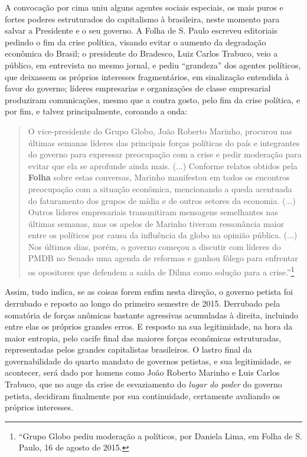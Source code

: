 A convocação por cima uniu alguns agentes sociais especiais, os mais
puros e fortes poderes estruturados do capitalismo à brasileira, neste
momento para salvar a Presidente e o seu governo. A Folha de S. Paulo
escreveu editoriais pedindo o fim da crise política, visando evitar o
aumento da degradação econômica do Brasil; o presidente do Bradesco,
Luiz Carlos Trabuco, veio a público, em entrevista no mesmo jornal, e
pediu ``grandeza'' dos agentes políticos, que deixassem os próprios
interesses fragmentários, em sinalização entendida à favor do governo;
líderes empresarias e organizações de classe empresarial produziram
comunicações, mesmo que a contra gosto, pelo fim da crise política, e
por fim, e talvez principalmente, coroando a onda:

\begin{quote}
O vice-presidente do Grupo Globo, João Roberto Marinho, procurou nas
últimas semanas líderes das principais forças políticas do país e
integrantes do governo para expressar preocupação com a crise e pedir
moderação para evitar que ela se aprofunde ainda mais. (...) Conforme
relatos obtidos pela \textbf{Folha} sobre estas conversas, Marinho
manifestou em todos os encontros preocupação com a situação econômica,
mencionando a queda acentuada do faturamento dos grupos de mídia e de
outros setores da economia. (...) Outros líderes empresariais
transmitiram mensagens semelhantes nas últimas semanas, mas os apelos de
Marinho tiveram ressonância maior entre os políticos por causa da
influência da globo na opinião pública. (...) Nos últimos dias, porém, o
governo começou a discutir com líderes do PMDB no Senado uma agenda de
reformas e ganhou fôlego para enfrentar os opositores que defendem a
saída de Dilma como solução para a crise.''\footnote{``Grupo Globo pediu
  moderação a políticos, por Daniela Lima, em Folha de S. Paulo, 16 de
  agosto de 2015.}
\end{quote} 


Assim, tudo indica, se as coisas forem enfim nesta direção, o governo
petista foi derrubado e reposto ao longo do primeiro semestre de 2015.
Derrubado pela somatória de forças anômicas bastante agressivas
acumuladas à direita, incluindo entre elas os próprios grandes erros. E
resposto na sua legitimidade, na hora da maior entropia, pelo cacife
final das maiores forças econômicas estruturadas, representadas pelos
grandes capitalistas brasileiros. O lastro final da governabilidade do
quarto mandato de governos petistas, e sua legitimidade, se acontecer,
será dado por homens como João Roberto Marinho e Luis Carlos Trabuco,
que no auge da crise de esvaziamento do \emph{lugar do poder} do governo
petista, decidiram finalmente por sua continuidade, certamente avaliando
os próprios interesses.

